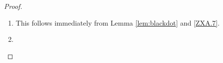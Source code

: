 \begin{proof}
\begin{enumerate}
\begin{align*}
\begin{tikzpicture}
\begin{pgfonlayer}{edgelayer}
		\draw [in=63, out=-117] (46.center) to (40);
	\end{pgfonlayer}
\end{tikzpicture}
=
\left\llbracket
\begin{tikzpicture}
	\begin{pgfonlayer}{nodelayer}
		\node [style=nothing] (41) at (0, 3.75) {};
		\node [style=nothing] (42) at (-0.5, 3.75) {};
		\node [style=nothing] (43) at (-0.5, 4.75) {};
		\node [style=nothing] (44) at (0, 4.75) {};
		\node [style=dot] (45) at (-0.5, 4.25) {};
		\node [style=dot] (46) at (0, 4.25) {};
		\node [style=onein] (47) at (0.5, 3.75) {};
		\node [style=zeroout] (48) at (0.5, 4.75) {};
		\node [style=oplus] (49) at (0.5, 4.25) {};
	\end{pgfonlayer}
	\begin{pgfonlayer}{edgelayer}
		\draw (42) to (45);
		\draw (45) to (43);
		\draw (44) to (46);
		\draw (46) to (41);
		\draw (47) to (49);
		\draw (49) to (48);
		\draw (49) to (46);
		\draw (46) to (45);
	\end{pgfonlayer}
\end{tikzpicture}
\right\rrbracket_{\hat{\TOF}}
\end{align*}


\item[\ref{TOF.8}:]
This follows immediately from Lemma \ref{lem:blackdot} and \ref{ZXA.7}.

\item[\ref{TOF.9}:]


\end{enumerate}
\end{proof}
